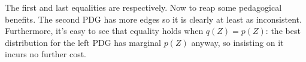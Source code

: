 \documentclass[twoside]{article}
\makeatletter
\theoremstyle{plain}
\theoremstyle{definition}
\let\H\relax
\DeclareMathOperator{\H}{\mathrm{H}} %
\DeclareMathOperator*{\Ex}{\mathbb{E}} %
\newcommand{\datadist}[1]{\Pr\nolimits_{#1}}
\newcommand\Inc{\mathit{Inc}}
\newcommand\aar{\@ifstar\aar@one@star\aar@plain}
\newcommand\aar@one@star{\@ifstar\aar@resize{\aar@plain*}}
\newcommand\aar@resize[1]{\sbox{\aar@content}{#1}\scaleleftright[3.8ex]
		{\Biggl\langle\!\!\!\!\Biggl\langle}{\usebox{\aar@content}}
		{\Biggr\rangle\!\!\!\!\Biggr\rangle}}
\makeatother
\begin{document}
The first and last equalities are  respectively.
Now to reap some pedagogical benefits.
The second PDG has more edges so it is clearly at least as inconsistent. Furthermore, it's easy to see that equality holds when $q(Z) \!=\! p(Z)$: the best distribution for the left PDG has marginal $p(Z)$ anyway, so insisting on it incurs no further cost.


\end{document}
